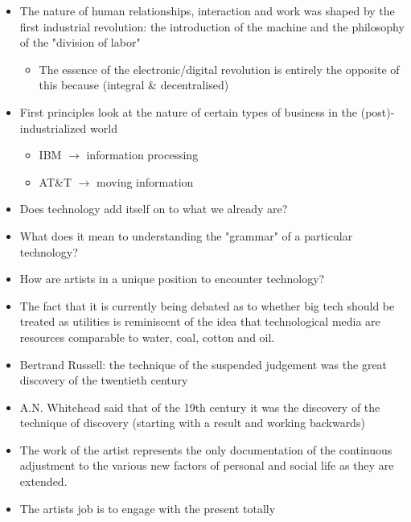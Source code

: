 \documentclass[11pt]{article}
\begin{document}
\begin{itemize}
\item The nature of human relationships, interaction and work was shaped
by the first industrial revolution: the introduction of the machine
and the philosophy of the "division of labor"
\begin{itemize}
\item The essence of the electronic/digital revolution is entirely the
opposite of this because (integral \& decentralised)
\end{itemize}

\item First principles look at the nature of certain types of business in
the (post)-industrialized world
\begin{itemize}
\item IBM \(\rightarrow\) information processing
\item AT\&T \(\rightarrow\) moving information
\end{itemize}

\item Does technology add itself on to what we already are?

\item What does it mean to understanding the "grammar" of a particular technology?

\item How are artists in a unique position to encounter technology?

\item The fact that it is currently being debated as to whether big tech
should be treated as utilities is reminiscent of the idea that
technological media are resources comparable to water, coal, cotton
and oil.

\item Bertrand Russell: the technique of the suspended judgement was the
great discovery of the twentieth century

\item A.N. Whitehead said that of the 19th century it was the discovery of
the technique of discovery (starting with a result and working
backwards)

\item The work of the artist represents the only documentation of the
continuous adjustment to the various new factors of personal and
social life as they are extended.

\item The artists job is to engage with the present totally
\end{itemize}
\end{document}
